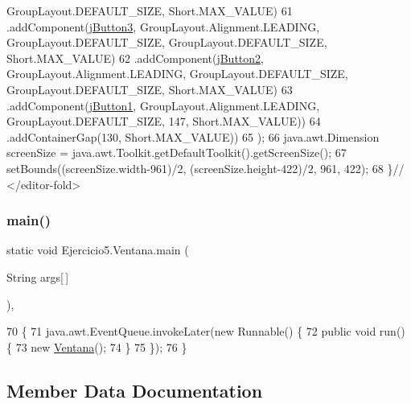 \begin{DoxyCode}
      GroupLayout.DEFAULT\_SIZE, Short.MAX\_VALUE)
61                    .addComponent(\mbox{\hyperlink{class_ejercicio5_1_1_ventana_ad6b3375b47f266259e624fe196b01145}{jButton3}}, GroupLayout.Alignment.LEADING, GroupLayout.DEFAULT\_SIZE,
       GroupLayout.DEFAULT\_SIZE, Short.MAX\_VALUE)
62                    .addComponent(\mbox{\hyperlink{class_ejercicio5_1_1_ventana_a88c68c1181c9c77989b5bc2dc1077e61}{jButton2}}, GroupLayout.Alignment.LEADING, GroupLayout.DEFAULT\_SIZE,
       GroupLayout.DEFAULT\_SIZE, Short.MAX\_VALUE)
63                    .addComponent(\mbox{\hyperlink{class_ejercicio5_1_1_ventana_a702e08175eb5d9e0c166057793e3485f}{jButton1}}, GroupLayout.Alignment.LEADING, GroupLayout.DEFAULT\_SIZE,
       147, Short.MAX\_VALUE))
64                 .addContainerGap(130, Short.MAX\_VALUE))
65         );
66         java.awt.Dimension screenSize = java.awt.Toolkit.getDefaultToolkit().getScreenSize();
67         setBounds((screenSize.width-961)/2, (screenSize.height-422)/2, 961, 422);
68     \}\textcolor{comment}{// </editor-fold>}
\end{DoxyCode}
\mbox{\label{class_ejercicio5_1_1_ventana_a9180f053f31fc66d34922b39d96dcf06}} 
\subsubsection{\texorpdfstring{main()}{main()}}
{\footnotesize\ttfamily static void Ejercicio5.\+Ventana.\+main (\begin{DoxyParamCaption}\item[{String}]{args\mbox{[}$\,$\mbox{]} }\end{DoxyParamCaption})\hspace{0.3cm}{\ttfamily [inline]}, {\ttfamily [static]}}


\begin{DoxyCode}
70                                            \{
71         java.awt.EventQueue.invokeLater(\textcolor{keyword}{new} Runnable() \{
72             \textcolor{keyword}{public} \textcolor{keywordtype}{void} run() \{
73                 \textcolor{keyword}{new} \mbox{\hyperlink{class_ejercicio5_1_1_ventana_af500cbb97dc8386f5c85ac586ae6f27c}{Ventana}}();
74             \}
75         \});
76     \}
\end{DoxyCode}


\subsection{Member Data Documentation}
\mbox{\label{class_ejercicio5_1_1_ventana_a702e08175eb5d9e0c166057793e3485f}} 
